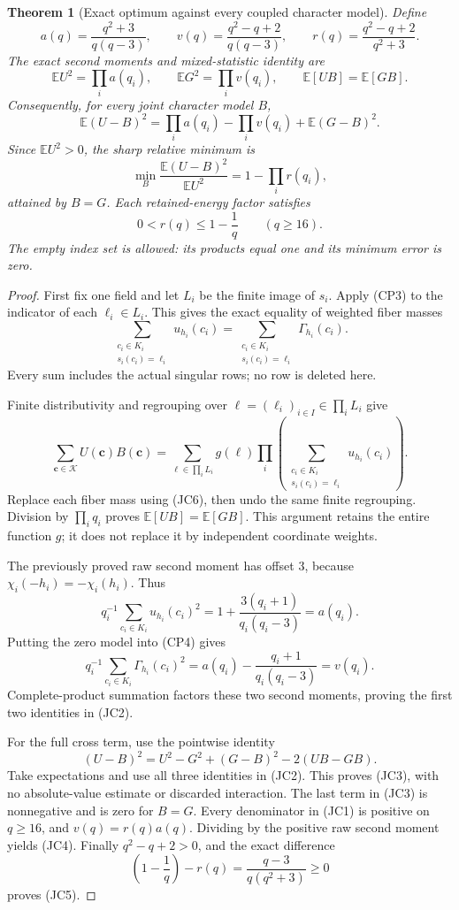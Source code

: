 \documentclass[11pt]{article}
\newtheorem{theorem}{Theorem}[section]
\begin{document}
\begin{theorem}[Exact optimum against every coupled character model]
\label{thm:joint-character-projection}
Define
\[
 a(q)=\frac{q^2+3}{q(q-3)},\qquad
 v(q)=\frac{q^2-q+2}{q(q-3)},\qquad
 r(q)=\frac{q^2-q+2}{q^2+3}.
 \tag{JC1}
\]
The exact second moments and mixed-statistic identity are
\[
 \mathbb E U^2=\prod_i a(q_i),\qquad
 \mathbb E G^2=\prod_i v(q_i),\qquad
 \mathbb E[UB]=\mathbb E[GB].
 \tag{JC2}
\]
Consequently, for every joint character model \(B\),
\[
 \mathbb E(U-B)^2
   =\prod_i a(q_i)-\prod_i v(q_i)+\mathbb E(G-B)^2.
 \tag{JC3}
\]
Since \(\mathbb E U^2>0\), the sharp relative minimum is
\[
 \min_B\frac{\mathbb E(U-B)^2}{\mathbb E U^2}
                 =1-\prod_i r(q_i),
 \tag{JC4}
\]
attained by \(B=G\). Each retained-energy factor satisfies
\[
                     0<r(q)\le1-\frac1q\qquad(q\ge16).
 \tag{JC5}
\]
The empty index set is allowed: its products equal one and its minimum
error is zero.
\end{theorem}

\begin{proof}
First fix one field and let \(L_i\) be the finite image of \(s_i\).
Apply (CP3) to the indicator of each \(\ell_i\in L_i\). This gives the
exact equality of weighted fiber masses
\[
 \sum_{\substack{c_i\in K_i\\s_i(c_i)=\ell_i}}u_{h_i}(c_i)
 =
 \sum_{\substack{c_i\in K_i\\s_i(c_i)=\ell_i}}\Gamma_{h_i}(c_i).
 \tag{JC6}
\]
Every sum includes the actual singular rows; no row is deleted here.

Finite distributivity and regrouping over
\(\ell=(\ell_i)_{i\in I}\in\prod_iL_i\) give
\[
 \sum_{\mathbf c\in\mathcal K}U(\mathbf c)B(\mathbf c)
 =
 \sum_{\ell\in\prod_iL_i}g(\ell)
   \prod_i
    \left(\sum_{\substack{c_i\in K_i\\s_i(c_i)=\ell_i}}
                         u_{h_i}(c_i)\right).
\]
Replace each fiber mass using (JC6), then undo the same finite
regrouping. Division by \(\prod_iq_i\) proves
\(\mathbb E[UB]=\mathbb E[GB]\). This argument retains the entire function
\(g\); it does not replace it by independent coordinate weights.

The previously proved raw second moment has offset \(3\), because
\(\chi_i(-h_i)=-\chi_i(h_i)\). Thus
\[
 q_i^{-1}\sum_{c_i\in K_i}u_{h_i}(c_i)^2
       =1+\frac{3(q_i+1)}{q_i(q_i-3)}=a(q_i).
\]
Putting the zero model into (CP4) gives
\[
 q_i^{-1}\sum_{c_i\in K_i}\Gamma_{h_i}(c_i)^2
       =a(q_i)-\frac{q_i+1}{q_i(q_i-3)}=v(q_i).
\]
Complete-product summation factors these two second moments, proving
the first two identities in (JC2).

For the full cross term, use the pointwise identity
\[
 (U-B)^2=U^2-G^2+(G-B)^2-2(UB-GB).
\]
Take expectations and use all three identities in (JC2). This proves
(JC3), with no absolute-value estimate or discarded interaction.
The last term in (JC3) is nonnegative and is zero for \(B=G\).
Every denominator in (JC1) is positive on \(q\ge16\), and
\(v(q)=r(q)a(q)\). Dividing by the positive raw second moment yields
(JC4). Finally \(q^2-q+2>0\), and the exact difference
\[
       \left(1-\frac1q\right)-r(q)
                  =\frac{q-3}{q(q^2+3)}\ge0
\]
proves (JC5).
\end{proof}
\end{document}
